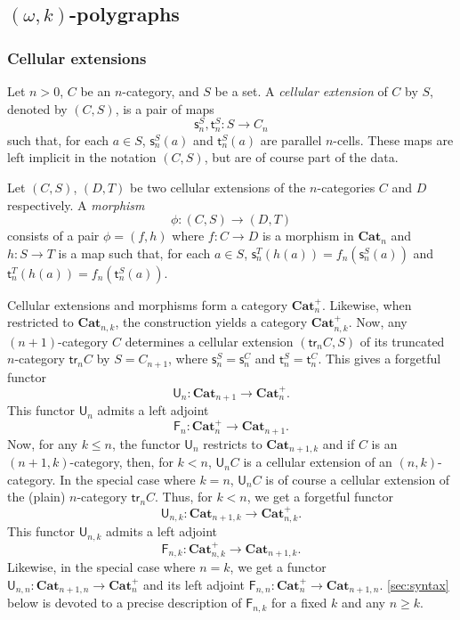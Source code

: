 \documentclass[reqno]{amsart}
\theoremstyle{plain}
\theoremstyle{definition}
\theoremstyle{remark}
\newcommand{\pair}[2]{(#1,#2)}       %
\newcommand{\source}{\mathsf{s}} %
\newcommand{\target}{\mathsf{t}} %
\newcommand{\ctg}[1]{\mathbf{#1}}  %
\newcommand{\Cat}{\ctg{Cat}}   %
\newcommand{\nCat}[1]{\Cat_{#1}}  %
\newcommand{\npCat}[2]{\Cat_{#1,#2}}  %
\newcommand{\nCatp}[1]{\Cat_{#1}^{+}} %
\newcommand{\npCatp}[2]{\Cat_{#1,#2}^{+}} %
\newcommand{\functor}[1]{\mathsf{#1}} %
\newcommand{\trk}[1]{\functor{tr}_{#1}}%
\newcommand{\fgf}[1]{\functor{U}_{#1}} %
\newcommand{\frf}[1]{\functor{F}_{#1}} %
\newcommand{\sce}[1]{\source_{#1}} %
\newcommand{\tge}[1]{\target_{#1}} %
\newcommand{\clx}[2]{\pair{#1}{#2}}%
\begin{document}
 \subsection{\texorpdfstring{$\pair{\omega}{k}$}{(ω,k)}-polygraphs}\label{subsec:okpol}
 \subsubsection{Cellular extensions}\label{ssubsec:cellext}
 Let $n>0$, $C$ be an $n$-category, and $S$ be a set. A {\em cellular
   extension} of $C$ by $S$, denoted by $\clx CS$, is a pair of maps
 \[\sce n^S,\tge n^S:S\to C_n\]
 such that, for each $a\in S$, $\sce n^S(a)$ and $\tge n^S(a)$ are
 parallel $n$-cells. These maps are left implicit in the notation
 $\clx CS$, but
 are of course part of the data. 
 
Let $\clx CS$, $\clx DT$ be two cellular extensions of the
$n$-categories $C$ and $D$ respectively.  A {\em morphism}
 \[\phi:\clx CS\to\clx DT\]
 consists of a pair $\phi=\pair fh$ where $f:C\to D$ is a morphism in
 $\nCat n$ and $h:S\to T$ is a map such that, for each $a\in S$, $\sce
 n^T(h(a))=f_n(\sce n^S(a))$ and $\tge n^T(h(a))=f_n(\tge n^S(a))$.

 Cellular extensions and morphisms form a category $\nCatp
 n$. Likewise, when restricted to $\npCat nk$, the
 construction yields a category $\npCatp nk$. Now,
 any $(n{+}1)$-category $C$ determines a cellular extension $\clx{\trk
   n C}{S}$ of its truncated $n$-category $\trk n C$ by
 $S=C_{n+1}$, where $\sce n^S=\sce n^C$ and $\tge n^S=\tge n^C$.
 This gives a forgetful functor
 \[\fgf n:\nCat {n+1}\to \nCatp n.\]
 This functor $\fgf n$ admits a left adjoint
 \[\frf n:\nCatp n\to\nCat {n+1}.\]
Now, for any $k\leq n$, the functor $\fgf n$ restricts to
$\npCat{n+1}{k}$ and if $C$ is an~$\pair{n{+}1}{k}$-category, then,
for $k<n$, 
$\fgf nC$ is a cellular extension of an $\pair nk$-category. In the
special case where $k=n$, $\fgf nC$ is of course a cellular extension
of the (plain) $n$-category $\trk nC$.
Thus, for $k<n$, we get a forgetful functor
\[\fgf{n,k}:\npCat{n+1}{k}\to \npCatp nk.\]
This functor $\fgf{n,k}$ admits a left adjoint
\[\frf{n,k}:\npCatp nk\to \npCat{n+1}{k}.\]
Likewise, in the special case where $n=k$, we get a functor $\fgf
{n,n}:\npCat{n+1}{n}\to \nCatp n$
and its left adjoint $\frf{n,n}:\nCatp n\to \npCat{n+1}{n}$.
\cref{sec:syntax} below is devoted to a precise description of $\frf
{n,k}$ for a fixed $k$ and any $n\geq k$.
\end{document}

